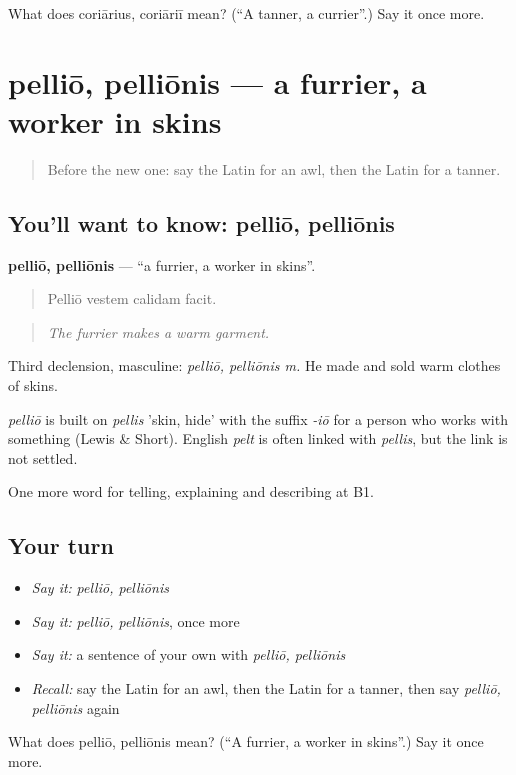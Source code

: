 \begin{tcolorbox}[breakable,colback=teal!4,colframe=teal!35!black,title={Before you move on}]
What does coriārius, coriāriī mean? (\textquotedblleft{}A tanner, a currier\textquotedblright{}.) Say it once more.
\end{tcolorbox}
\section[pelliō, pelliōnis]{pelliō, pelliōnis — a furrier, a worker in skins}

\label{lesson:LA-C467-pellio}



\begin{quote}
Before the new one: say the Latin for an awl, then the Latin for a tanner.
\end{quote}

\subsection*{You'll want to know: pelliō, pelliōnis}
\textbf{pelliō, pelliōnis} — \textquotedblleft{}a furrier, a worker in skins\textquotedblright{}.

\begin{quote}
Pelliō vestem calidam facit.
\end{quote}

\begin{quote}
\emph{The furrier makes a warm garment.}
\end{quote}

Third declension, masculine: \emph{pelliō, pelliōnis m.} He made and sold warm clothes of skins.

\begin{cousinweb}
\emph{pelliō} is built on \emph{pellis} 'skin, hide' with the suffix \emph{-iō} for a person who works with something (Lewis \& Short). English \emph{pelt} is often linked with \emph{pellis}, but the link is not settled.
\end{cousinweb}

\begin{grammarlens}[title={What you've built}]
One more word for telling, explaining and describing at B1.
\end{grammarlens}

\subsection*{Your turn}
\begin{itemize}
\raggedright
  \item \emph{Say it:} \emph{pelliō, pelliōnis}
  \item \emph{Say it:} \emph{pelliō, pelliōnis}, once more
  \item \emph{Say it:} a sentence of your own with \emph{pelliō, pelliōnis}
  \item \emph{Recall:} say the Latin for an awl, then the Latin for a tanner, then say \emph{pelliō, pelliōnis} again
\end{itemize}

\begin{tcolorbox}[breakable,colback=teal!4,colframe=teal!35!black,title={Before you move on}]
What does pelliō, pelliōnis mean? (\textquotedblleft{}A furrier, a worker in skins\textquotedblright{}.) Say it once more.
\end{tcolorbox}
